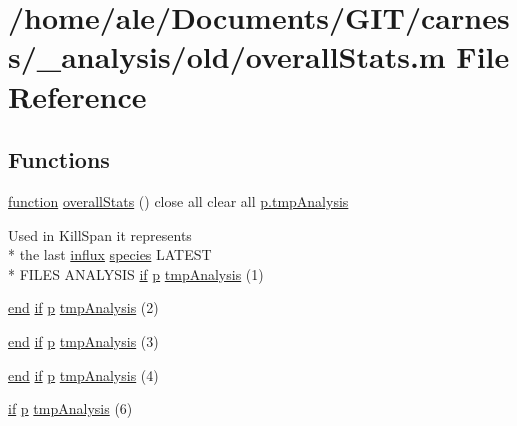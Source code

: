 \hypertarget{a00026}{\section{/home/ale/\-Documents/\-G\-I\-T/carness/\-\_\-analysis/old/overall\-Stats.m File Reference}
\label{a00026}
}
\subsection*{Functions}
\begin{DoxyCompactItemize}
\item 
\hyperlink{a00062_a4b4c670b101bf7a838f775e008fa6255}{function} \hyperlink{a00026_af72d21f936b4c0577485d0bae4509087}{overall\-Stats} () close all clear all \hyperlink{a00026_a98ae4bf3f5f573af6ea4fc18d2a1125e}{p.\-tmp\-Analysis}
\item 
Used in Kill\-Span it represents \\*
the last \hyperlink{a00059_a902e747aeec6b345d3a057099152f41f}{influx} \hyperlink{a00016}{species} L\-A\-T\-E\-S\-T \\*
F\-I\-L\-E\-S A\-N\-A\-L\-Y\-S\-I\-S \hyperlink{a00024_a01d55766b8058903dd360b4bda71f9f5}{if} \hyperlink{a00022_aa2b4c35904308d35fc5d606a429e608d}{p} \hyperlink{a00026_a0bafb8140cf49e5e5478c170ffa8880d}{tmp\-Analysis} (1)
\item 
\hyperlink{a00019_afb358f48b1646c750fb9da6c6585be2b}{end} \hyperlink{a00024_a01d55766b8058903dd360b4bda71f9f5}{if} \hyperlink{a00022_aa2b4c35904308d35fc5d606a429e608d}{p} \hyperlink{a00026_ab41953ee2db3da78ed71808b12490209}{tmp\-Analysis} (2)
\item 
\hyperlink{a00019_afb358f48b1646c750fb9da6c6585be2b}{end} \hyperlink{a00024_a01d55766b8058903dd360b4bda71f9f5}{if} \hyperlink{a00022_aa2b4c35904308d35fc5d606a429e608d}{p} \hyperlink{a00026_a2e3fcc5ce8c864c086058fa1fcd8adb4}{tmp\-Analysis} (3)
\item 
\hyperlink{a00019_afb358f48b1646c750fb9da6c6585be2b}{end} \hyperlink{a00024_a01d55766b8058903dd360b4bda71f9f5}{if} \hyperlink{a00022_aa2b4c35904308d35fc5d606a429e608d}{p} \hyperlink{a00026_a08f902f5af41bb11acdd6ce5130e5934}{tmp\-Analysis} (4)
\item 
\hyperlink{a00024_a01d55766b8058903dd360b4bda71f9f5}{if} \hyperlink{a00022_aa2b4c35904308d35fc5d606a429e608d}{p} \hyperlink{a00026_a98ae4bf3f5f573af6ea4fc18d2a1125e}{tmp\-Analysis} (6)
\item 

\end{DoxyCompactItemize}

